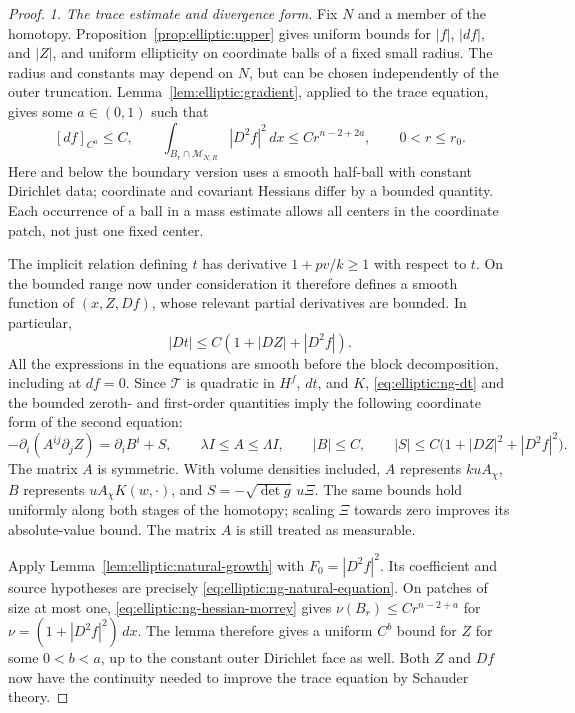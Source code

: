 \begin{proof}
\emph{1. The trace estimate and divergence form.}
Fix $N$ and a member of the homotopy.  Proposition~\ref{prop:elliptic:upper} gives
uniform bounds for $|f|$, $|df|$, and $|Z|$, and uniform ellipticity on
coordinate balls of a fixed small radius.  The radius and constants may
depend on $N$, but can be chosen independently of the outer truncation.
Lemma~\ref{lem:elliptic:gradient}, applied to the trace equation, gives some
$a\in(0,1)$ such that
\begin{equation}\label{eq:elliptic:ng-hessian-morrey}
 [df]_{C^a}\le C,
 \qquad
 \int_{B_r\cap\mathcal M_{N,R}}|D^2f|^2\,dx
       \le C r^{n-2+2a},\qquad 0<r\le r_0.
\end{equation}
Here and below the boundary version uses a smooth half-ball with constant
Dirichlet data; coordinate and covariant Hessians differ by a bounded
quantity.  Each occurrence of a ball in a mass estimate allows all
centers in the coordinate patch, not just one fixed center.

The implicit relation defining $t$ has derivative
$1+pv/k\ge1$ with respect to $t$.  On the bounded range now under
consideration it therefore defines a smooth function of $(x,Z,Df)$,
whose relevant partial derivatives are bounded.  In particular,
\begin{equation}\label{eq:elliptic:ng-dt}
 |Dt|\le C(1+|DZ|+|D^2f|).
\end{equation}
All the expressions in the equations are smooth before the block
decomposition, including at $df=0$.  Since $\mathcal T$ is quadratic
in $H^f$, $dt$, and $K$, \eqref{eq:elliptic:ng-dt} and the bounded
zeroth- and first-order quantities imply the following coordinate form
of the second equation:
\begin{equation}\label{eq:elliptic:ng-natural-equation}
 -\partial_i(A^{ij}\partial_j Z)=\partial_i B^i+S,
 \qquad
 \lambda I\le A\le\Lambda I,
 \qquad |B|\le C,
 \qquad |S|\le C\bigl(1+|DZ|^2+|D^2f|^2\bigr).
\end{equation}
The matrix $A$ is symmetric.  With volume densities included,
$A$ represents $kuA_\chi$, $B$ represents $uA_\chi K(w,\cdot)$,
and $S=-\sqrt{\det g}\,u\Xi$.  The same bounds hold uniformly along
both stages of the homotopy; scaling $\Xi$ towards zero improves its
absolute-value bound.  The matrix $A$ is still treated as measurable.

Apply Lemma~\ref{lem:elliptic:natural-growth} with
$F_0=|D^2f|^2$.  Its coefficient and source hypotheses are precisely
\eqref{eq:elliptic:ng-natural-equation}.  On patches of size
at most one, \eqref{eq:elliptic:ng-hessian-morrey} gives
$\nu(B_r)\le Cr^{n-2+a}$ for
$\nu=(1+|D^2f|^2)\,dx$.  The lemma therefore gives a uniform
$C^b$ bound for $Z$ for some $0<b<a$, up to the constant outer
Dirichlet face as well.  Both $Z$ and $Df$ now have the continuity
needed to improve the trace equation by Schauder theory.


\end{proof}
